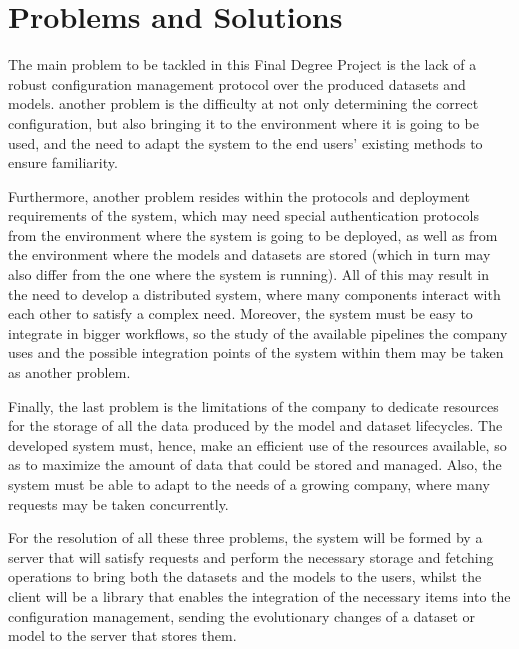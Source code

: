 \section{Problems and Solutions}

The main problem to be tackled in this Final Degree Project is the lack of a robust configuration management protocol over the produced datasets and models. another
problem is the difficulty at not only determining the correct configuration, but also bringing it to the environment where it is going to be used, and the need to adapt the
system to the end users' existing methods to ensure familiarity.

Furthermore, another problem resides within the protocols and deployment requirements of the system, which may need special authentication protocols from
the environment where the system is going to be deployed, as well as from the environment where the models and datasets are stored (which in turn may also differ
from the one where the system is running). All of this may result in the need to develop a distributed system, where many components interact with each other
to satisfy a complex need. Moreover, the system must be easy to integrate in bigger workflows, so the study of the available pipelines the company uses and the 
possible integration points of the system within them may be taken as another problem.

Finally, the last problem is the limitations of the company to dedicate resources for the storage of all the data produced by the model and dataset lifecycles.
The developed system must, hence, make an efficient use of the resources available, so as to maximize the amount of data that could be stored and managed. Also,
the system must be able to adapt to the needs of a growing company, where many requests may be taken concurrently.

For the resolution of all these three problems, the system will be formed by a server that will satisfy requests and perform the necessary storage and
fetching operations to bring both the datasets and the models to the users, whilst the client will be a library that enables the integration of the
necessary items into the configuration management, sending the evolutionary changes of a dataset or model to the server that stores them.


